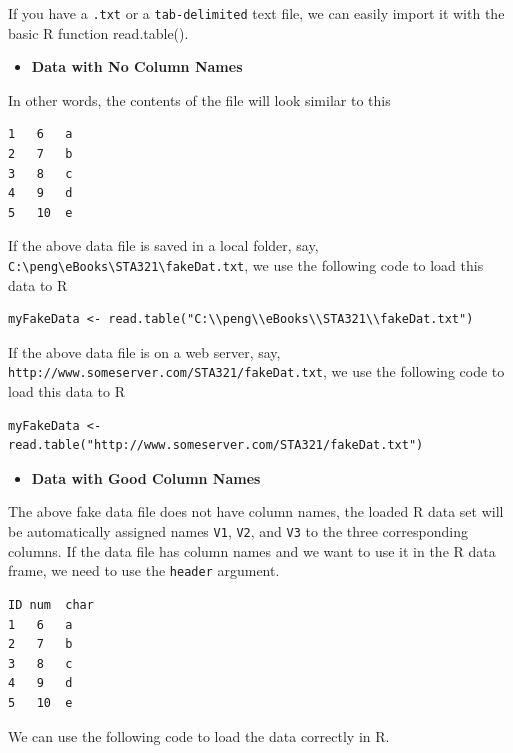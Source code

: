 \documentclass[
]{book}
\providecommand{\tightlist}{%
  \setlength{\itemsep}{0pt}\setlength{\parskip}{0pt}}
\begin{document}
If you have a \texttt{.txt} or a \texttt{tab-delimited} text file, we can easily import it with the basic R function read.table().

\begin{itemize}
\tightlist
\item
  \textbf{Data with No Column Names}
\end{itemize}

In other words, the contents of the file will look similar to this

\begin{verbatim}
1   6   a
2   7   b
3   8   c
4   9   d
5   10  e
\end{verbatim}

If the above data file is saved in a local folder, say, \texttt{C:\textbackslash{}peng\textbackslash{}eBooks\textbackslash{}STA321\textbackslash{}fakeDat.txt}, we use the following code to load this data to R

\begin{verbatim}
myFakeData <- read.table("C:\\peng\\eBooks\\STA321\\fakeDat.txt")
\end{verbatim}

If the above data file is on a web server, say, \texttt{http://www.someserver.com/STA321/fakeDat.txt}, we use the following code to load this data to R

\begin{verbatim}
myFakeData <- read.table("http://www.someserver.com/STA321/fakeDat.txt")
\end{verbatim}

\begin{itemize}
\tightlist
\item
  \textbf{Data with Good Column Names}
\end{itemize}

The above fake data file does not have column names, the loaded R data set will be automatically assigned names \texttt{V1}, \texttt{V2}, and \texttt{V3} to the three corresponding columns. If the data file has column names and we want to use it in the R data frame, we need to use the \texttt{header} argument.

\begin{verbatim}
ID num  char
1   6   a
2   7   b
3   8   c
4   9   d
5   10  e
\end{verbatim}

We can use the following code to load the data correctly in R.
\end{document}
